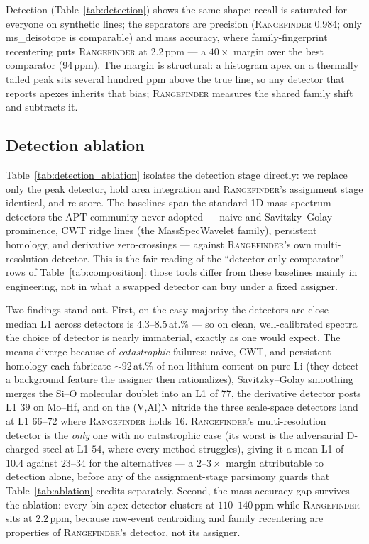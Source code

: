 \documentclass[11pt]{article}
\newcommand{\rf}{\textsc{Rangefinder}}
\begin{document}
Detection (Table~\ref{tab:detection}) shows the same shape: recall is
saturated for everyone on synthetic lines; the separators are precision
(\rf{} 0.984; only ms\_deisotope is comparable) and mass accuracy, where
family-fingerprint recentering puts \rf{} at 2.2\,ppm --- a $40\times$
margin over the best comparator (94\,ppm). The margin is structural: a
histogram apex on a thermally tailed peak sits several hundred ppm above
the true line, so any detector that reports apexes inherits that bias;
\rf{} measures the shared family shift and subtracts it.

\subsection{Detection ablation}
\label{sec:detection_ablation}
Table~\ref{tab:detection_ablation} isolates the detection stage directly:
we replace only the peak detector, hold area integration and \rf{}'s
assignment stage identical, and re-score. The baselines span the standard
1D mass-spectrum detectors the APT community never adopted --- naive and
Savitzky--Golay prominence, CWT ridge lines (the MassSpecWavelet family),
persistent homology, and derivative zero-crossings --- against \rf{}'s own
multi-resolution detector. This is the fair reading of the ``detector-only
comparator'' rows of Table~\ref{tab:composition}: those tools differ from
these baselines mainly in engineering, not in what a swapped detector can
buy under a fixed assigner.

Two findings stand out. First, on the easy majority the detectors are
close --- median L1 across detectors is $4.3$--$8.5$\,at.\% --- so on clean,
well-calibrated spectra the choice of detector is nearly immaterial, exactly
as one would expect. The means diverge because of \emph{catastrophic}
failures: naive, CWT, and persistent homology each fabricate ${\sim}92$\,at.\%
of non-lithium content on pure Li (they detect a background feature the
assigner then rationalizes), Savitzky--Golay smoothing merges the Si--O
molecular doublet into an L1 of 77, the derivative detector posts L1 $39$
on Mo--Hf, and on the (V,Al)N nitride the three scale-space detectors land
at L1 $66$--$72$ where \rf{} holds $16$. \rf{}'s multi-resolution detector
is the \emph{only} one with no catastrophic case (its worst is the
adversarial D-charged steel at L1 $54$, where every method struggles),
giving it a mean L1 of $10.4$ against $23$--$34$ for the alternatives --- a
$2$--$3\times$ margin attributable to detection alone, before any of the
assignment-stage parsimony guards that Table~\ref{tab:ablation} credits
separately. Second, the mass-accuracy gap
survives the ablation: every bin-apex detector clusters at
$110$--$140$\,ppm while \rf{} sits at $2.2$\,ppm, because raw-event
centroiding and family recentering are properties of \rf{}'s detector, not
its assigner.
\end{document}
